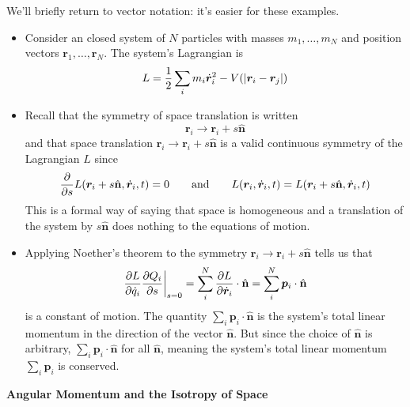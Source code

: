 \documentclass[11pt, a4paper]{article}
\newcommand{\eqtext}[1]{\qquad \text{#1} \qquad}
\newcommand{\uvec}[1]{\hat{\mathbf{#1}}}
\newcommand{\bdot}[1]{\dot{\bm{#1}}}
\begin{document}
\smallskip 
We'll briefly return to vector notation: it's easier for these examples.
\begin{itemize}
	\item  Consider an closed system of $ N $ particles with masses $ m_1, \ldots, m_N$ and position vectors $ \bm{r}_1, \ldots, \bm{r}_{N} $. The system's Lagrangian is
	\begin{equation*}
		L = \frac{1}{2}\sum_{i}m_{i} \bdot{r}_{i}^{2} - V(\abs{\bm{r}_{i} - \bm{r}_{j}})
	\end{equation*}
	
	\item Recall that the symmetry of space translation is written
	\begin{equation*}
		\bm{r}_{i} \to \bm{r}_{i} + s \uvec{n}
	\end{equation*}
	and that space translation $ \bm{r}_{i} \to \bm{r}_{i} + s \uvec{n} $ is a valid continuous symmetry of the Lagrangian $ L $ since
	\begin{equation*}
		\pdv{}{s}	L(\bm{r}_{i} + s \uvec{n}, \bdot{r}_{i}, t)  = 0 \eqtext{and} L(\bm{r}_{i}, \bdot{r}_{i}, t) = L(\bm{r}_{i} + s \uvec{n}, \bdot{r}_{i}, t)
	\end{equation*}	
	This is a formal way of saying that space is homogeneous and a translation of the system by $ s\uvec{n} $ does nothing to the equations of motion. 
	
	\item Applying Noether's theorem to the symmetry $ \bm{r}_{i} \to \bm{r}_{i} + s \uvec{n} $ tells us that
	\begin{equation*}
		\eval{\pdv{L}{\dot{q}_{i}} \pdv{Q_{i}}{s}}_{s=0} = \sum_{i}^{N} \pdv{L}{\bdot{r}_{i}} \cdot \uvec{n} =  \sum_{i}^{N} \bm{p}_{i} \cdot \uvec{n} 
	\end{equation*}
	is a constant of motion. The quantity $ \sum_{i} \bm{p}_{i} \cdot \uvec{n}  $ is the system's total linear momentum in the direction of the vector $ \uvec{n} $. But since the choice of $ \uvec{n} $ is arbitrary, $ \sum_{i} \bm{p}_{i} \cdot \uvec{n} $ for all $ \uvec{n} $, meaning the system's total linear momentum $ \sum_{i} \bm{p}_{i}$ is conserved. 
		
\end{itemize}

\textbf{Angular Momentum and the Isotropy of Space}
\end{document}
